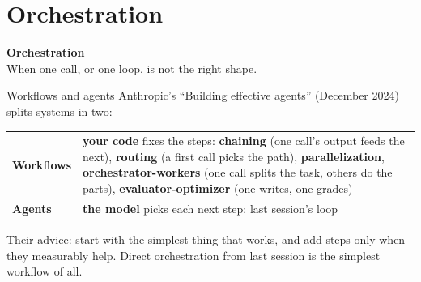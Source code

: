 \documentclass[aspectratio=169]{beamer}
\newcommand{\keybox}[1]{%
  \begin{tcolorbox}[colback=armblue!8, colframe=armblue, boxrule=0.6pt, arc=2pt]
  #1
  \end{tcolorbox}}
\newcommand{\sectiontransition}[2]{%
  \begin{frame}[plain]
    \vfill
    \begin{center}
      {\Huge\bfseries\color{popblue} #1}\\[1.1em]
      {\large #2}
    \end{center}
    \vfill
  \end{frame}}
\begin{document}
\section{Orchestration}
\sectiontransition{Orchestration}{When one call, or one loop, is not the right shape.}

\begin{frame}{Workflows and agents}
  \vspace{0.3em}
  {\small Anthropic's ``Building effective agents'' (December 2024) splits systems in two:}

  \vspace{0.4em}
  \begin{center}
  \small
  \begin{tabular}{>{\raggedright\arraybackslash}p{}>{\raggedright\arraybackslash}p{}}
    \toprule
    \textbf{Workflows} & \textbf{your code} fixes the steps: \textbf{chaining} (one call's output feeds the next),
      \textbf{routing} (a first call picks the path), \textbf{parallelization}, \textbf{orchestrator-workers}
      (one call splits the task, others do the parts), \textbf{evaluator-optimizer} (one writes, one grades) \\[0.3em]
    \textbf{Agents} & \textbf{the model} picks each next step: last session's loop \\
    \bottomrule
  \end{tabular}
  \end{center}

  \vspace{0.4em}
  \keybox{\small Their advice: start with the simplest thing that works, and add steps only when they measurably
  help. Direct orchestration from last session is the simplest workflow of all.}
\end{frame}
\end{document}
